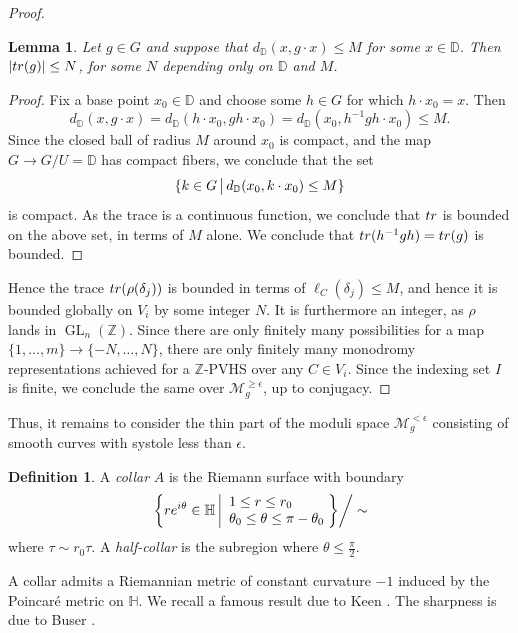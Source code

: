 \documentclass[10pt,letterpaper,english,reqno]{amsart}
\numberwithin{equation}{subsection}
\newcommand\cM{{\mathcal M}}
\newcommand\bD{{\mathbb D}}
\newcommand\bH{{\mathbb H}}
\newcommand\Z{{\mathbb Z}}
\DeclareMathOperator{\GL}{GL}
\newtheorem{lemma}[theorem]{Lemma}
\theoremstyle{definition}
\newtheorem{definition}[theorem]{Definition}
\begin{document}
\begin{proof}
\begin{lemma}\label{translation-bound}
Let $g\in G$ and suppose that $d_\bD(x,g\cdot x)\leq M$
for some $x\in \bD$. Then $|{\rm tr}(g)|\leq N$, for some $N$ depending only on $\bD$ and $M$. 
\end{lemma}

\begin{proof} Fix a base point $x_0\in \bD$ and choose some $h\in G$
for which $h\cdot x_0 = x$. Then
$$d_\bD(x,g\cdot x) = d_\bD(h\cdot x_0, gh\cdot x_0) = 
d_\bD(x_0,h^{-1}gh\cdot x_0)\leq M.$$
Since the closed ball of radius $M$ around $x_0$ is compact,
and the map $G\to G/U=\bD$ has compact fibers,
we conclude that the set $$\{k\in G\,\big{|}\,
d_\bD(x_0,k\cdot x_0)\leq M\}$$ is compact. As the trace
is a continuous function, we conclude that ${\rm tr}$ is bounded
on the above set, in terms of $M$ alone. We conclude that
${\rm tr}(h^{-1}gh)={\rm tr}(g)$ is bounded.
\end{proof}

Hence the trace ${\rm tr}(\rho(\delta_j))$ is
bounded in terms of $\ell_C(\delta_j)\leq M$,
and hence it is bounded globally
on $V_i$ by some integer $N$. It is furthermore an integer,
as $\rho$ lands in $\GL_n(\Z)$. Since there are only
finitely many possibilities for a map
$\{1,\dots,m\}\to \{-N,\dots,N\}$,
there are only finitely many monodromy representations
achieved for a $\Z$-PVHS over any $C\in V_i$.
Since the indexing set $I$ is finite,
we conclude the same over $\cM_g^{\geq \epsilon}$, up to conjugacy.
\end{proof}

Thus, it remains to consider the thin part of the moduli
space $\cM_g^{<\epsilon}$ consisting of smooth curves with systole less than $\epsilon$.


\begin{definition}\label{collar-def}
A {\it collar} $A$ is the
Riemann surface with boundary 
$$\left.\left\{
re^{i\theta}\in \bH
\left|
\begin{array}{l}
			1\leq r \leq r_0 \\
			\theta_0\leq \theta \leq \pi-\theta_0
\end{array}
\right.\!\!
\right\}\right/\sim$$
where $\tau\sim r_0\tau$.
A {\it half-collar}
is the subregion where $\theta\leq \tfrac{\pi}{2}$. 
\end{definition}

A collar admits a Riemannian metric of constant curvature $-1$ induced by the Poincar\'e metric on $\mathbb{H}$. We recall a famous result
due to Keen \cite{keen}. The sharpness is due
to Buser \cite[Thm.~C]{buser}.
\end{document}
